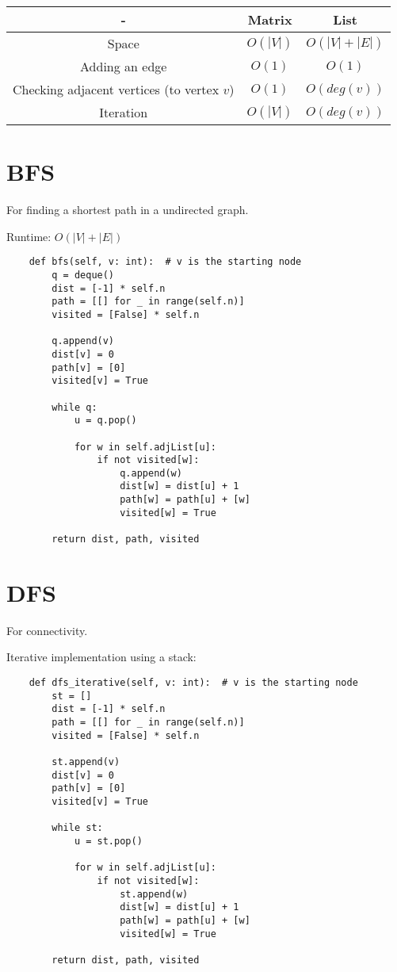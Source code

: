 \begin{center}
  \begin{tabular}{ | c | c | c | }
    \hline
    - & Matrix & List \\
    \hline
    Space & $O(|V|)$ & $O(|V| + |E|)$ \\
    \hline
    Adding an edge & $O(1)$ & $O(1)$ \\
    \hline
    Checking adjacent vertices (to vertex $v$) & $O(1)$ & $O(deg(v))$ \\
    \hline
    Iteration & $O(|V|)$ & $O(deg(v))$ \\
    \hline
  \end{tabular}
\end{center}

\section{BFS}

For finding a shortest path in a undirected graph.

Runtime: $O(|V| + |E|)$

\begin{verbatim}
    def bfs(self, v: int):  # v is the starting node
        q = deque()
        dist = [-1] * self.n
        path = [[] for _ in range(self.n)]
        visited = [False] * self.n

        q.append(v)
        dist[v] = 0
        path[v] = [0]
        visited[v] = True

        while q:
            u = q.pop()

            for w in self.adjList[u]:
                if not visited[w]:
                    q.append(w)
                    dist[w] = dist[u] + 1
                    path[w] = path[u] + [w]
                    visited[w] = True

        return dist, path, visited
\end{verbatim}

\section{DFS}

For connectivity.

\noindent Iterative implementation using a stack:

\begin{verbatim}
    def dfs_iterative(self, v: int):  # v is the starting node
        st = []
        dist = [-1] * self.n
        path = [[] for _ in range(self.n)]
        visited = [False] * self.n

        st.append(v)
        dist[v] = 0
        path[v] = [0]
        visited[v] = True

        while st:
            u = st.pop()

            for w in self.adjList[u]:
                if not visited[w]:
                    st.append(w)
                    dist[w] = dist[u] + 1
                    path[w] = path[u] + [w]
                    visited[w] = True

        return dist, path, visited
\end{verbatim}


